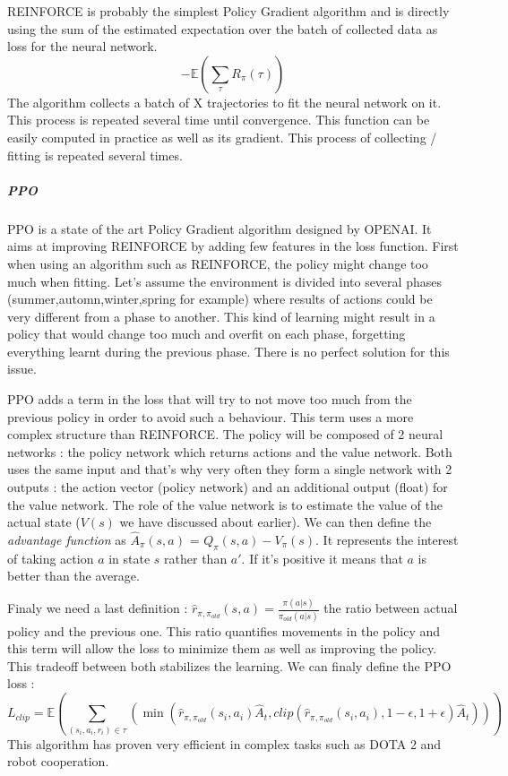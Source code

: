 \documentclass[11pt]{article}
\begin{document}
REINFORCE is probably the simplest Policy Gradient algorithm and is directly using the sum of the estimated expectation over the batch of collected data as loss for the neural network.
$$-\mathbb{E}(\sum_{\tau}R_{\pi}(\tau))$$
The algorithm collects a batch of X trajectories to fit the neural network on it. This process is repeated several time until convergence.
This function can be easily computed in practice as well as its gradient. This process of collecting / fitting is repeated several times.
\subparagraph{PPO}
PPO is a state of the art Policy Gradient algorithm designed by OPENAI. It aims at improving REINFORCE by adding few features in the loss function. First when using an algorithm such as REINFORCE, the policy might change too much when fitting. Let's assume the environment is divided into several phases (summer,automn,winter,spring for example) where results of actions could be very different from a phase to another. This kind of learning might result in a policy that would change too much and overfit on each phase, forgetting everything learnt during the previous phase. There is no perfect solution for this issue.

PPO adds a term in the loss that will try to not move too much from the previous policy in order to avoid such a behaviour. This term uses a more complex structure than REINFORCE. The policy will be composed of 2 neural networks : the policy network which returns actions and the value network. Both uses the same input and that's why very often they form a single network with 2 outputs : the action vector (policy network) and an additional output (float) for the value network. The role of the value network is to estimate the value of the actual state ($V(s)$ we have discussed about earlier). We can then define the \emph{advantage function} as $\hat A_{\pi}(s,a)$ = $Q_\pi(s,a)-V_\pi(s)$. It represents the interest of taking action $a$ in state $s$ rather than $a'$. If it's positive it means that $a$ is better than the average.

Finaly we need a last definition : $\hat r_{\pi,\pi_{old}}(s,a) = \frac{\pi(a|s)}{\pi_{old}(a|s)}$ the ratio between actual policy and the previous one. This ratio quantifies movements in the policy and this term will allow the loss to minimize them as well as improving the policy. This tradeoff between both stabilizes the learning. We can finaly define the PPO loss :
$$L_{clip} = \mathbb{E}(\sum_{(s_i,a_i,r_i)\in\tau}(\min(\hat r_{\pi,\pi_{old}}(s_i,a_i)\hat A_t,clip(\hat r_{\pi,\pi_{old}}(s_i,a_i),1-\epsilon,1+\epsilon)\hat A_t)))$$
This algorithm has proven very efficient in complex tasks such as DOTA 2 and robot cooperation.
\end{document}
